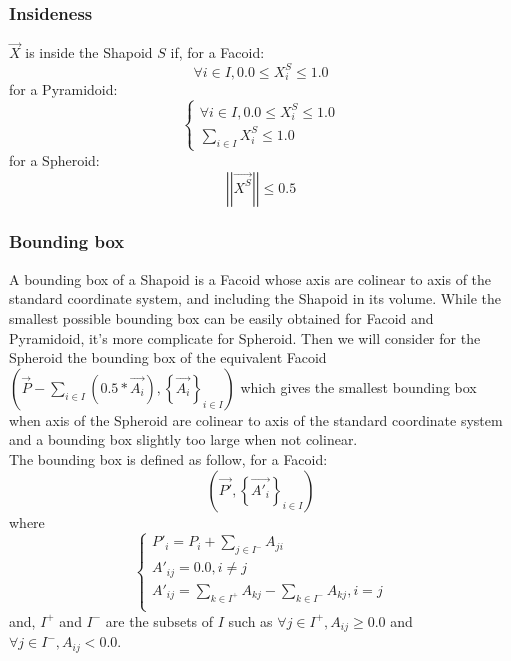 \documentclass[12pt, a4paper]{article}
\begin{document}
\subsubsection{Insideness}

$\overrightarrow{X}$ is inside the Shapoid $S$ if, for a Facoid:\\
\begin{equation}
\forall i\in I,0.0\le X_i^S\le1.0
\end{equation}
for a Pyramidoid:\\
\begin{equation}
\left\lbrace\begin{array}{l}
\forall i\in I,0.0\le X_i^S\le1.0\\
\sum_{i\in I}X_i^S\le1.0
\end{array}\right.
\end{equation}
for a Spheroid:\\
\begin{equation}
\left|\left|\overrightarrow{X^S}\right|\right|\le0.5
\end{equation}

\subsubsection{Bounding box}

A bounding box of a Shapoid is a Facoid whose axis are colinear to axis of the standard coordinate system, and including the Shapoid in its volume. While the smallest possible bounding box can be easily obtained for Facoid and Pyramidoid, it's more complicate for Spheroid. Then we will consider for the Spheroid the bounding box of the equivalent Facoid $\left(\overrightarrow{P}-\sum_{i\in I}\left(0.5*\overrightarrow{A_i}\right),\left\lbrace\overrightarrow{A_i}\right\rbrace_{i\in I}\right)$ which gives the smallest bounding box when axis of the Spheroid are colinear to axis of the standard coordinate system and a bounding box slightly too large when not colinear.\\
The bounding box is defined as follow, for a Facoid:\\
\begin{equation}
\left(\overrightarrow{P'},\left\lbrace\overrightarrow{A'_i}\right\rbrace_{i\in I}\right)
\end{equation}
where\\
\begin{equation}
\left\lbrace
\begin{array}{l}
P'_i=P_i+\sum_{j\in I^-}A_{ji}\\
A'_{ij}=0.0,i\neq j\\
A'_{ij}=\sum_{k\in I^+}A_{kj}-\sum_{k\in I^-}A_{kj},i=j\\
\end{array}
\right.
\end{equation}
and, $I^+$ and $I^-$ are the subsets of $I$ such as $\forall j\in I^+,A_{ij}\ge 0.0$ and $\forall j\in I^-,A_{ij}<0.0$.\\
\end{document}
